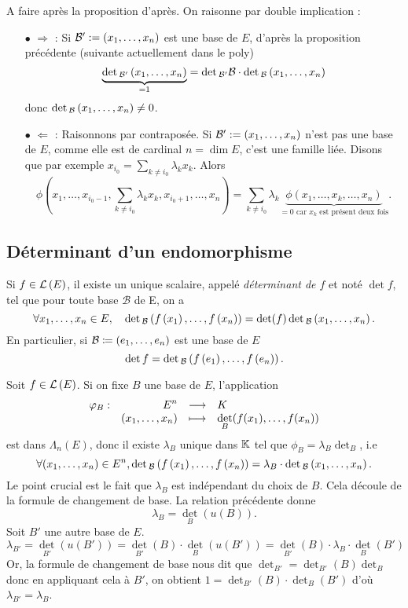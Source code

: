 \documentclass{magnolia}
\begin{document}
  \begin{preuve}
  A faire après la proposition d'après.
  On raisonne par double implication :
  \begin{itemize}
  \item[$\bullet$] $\Rightarrow$ : Si $\mathcal{B}':=\left(x_1,\ldots,x_n\right)$ est une base de $E$, d'après la proposition précédente (suivante actuellement dans le poly) $$\underbrace{\mathop{\rm det}{}_{\mathcal{B}'}\left(x_1,\ldots,x_n\right)}_{=1}=\mathop{\rm det}{}_{\mathcal{B}'}\mathcal{B}\cdot
    \mathop{\rm det}{}_{\mathcal{B}}\left(x_1,\ldots,x_n\right)$$ donc $\mathop{\rm det}{}_{\mathcal{B}}\left(x_1,\ldots,x_n\right)\neq 0$.
  \item[$\bullet$] $\Leftarrow$ : Raisonnons par contraposée. Si $\mathcal{B}':=\left(x_1,\ldots,x_n\right)$ n'est pas une base de $E$, comme elle est de cardinal $n=\dim E$, c'est une famille liée. Disons que par exemple $x_{i_0}=\sum_{k\neq i_0}\lambda_k x_k$. Alors
  $$\phi(x_1,\ldots,x_{i_0-1},\sum_{k\neq i_0}\lambda_k x_k,x_{i_0+1},\ldots,x_n)=\sum_{k\neq i_0}\lambda_k \underbrace{\phi(x_1,\ldots,x_k,\ldots,x_n)}_{=0 \text{ car } x_k \text{ est présent deux fois}}.$$
  \end{itemize}
  \end{preuve}

\subsection{Déterminant d'un endomorphisme}
\begin{definition}
Si $f\in\mathcal{L}\left(E\right)$, il existe un unique scalaire, appelé \emph{déterminant de $f$} et noté
$\det f$, tel que pour toute base $\mathcal{B}$ de E, on a
\[\forall x_1,\ldots,x_n\in E ,\quad
  \mathop{\rm det}{}_{\mathcal{B}}\left(f\left(x_1\right),\ldots,f\left(x_n\right)\right)=\mathop{\rm det}(f)\mathop{\rm det}{}_{\mathcal{B}}
  \left(x_1,\ldots,x_n\right).\]
En particulier, si $\mathcal{B}\coloneqq\left(e_1,\ldots,e_n\right)$ est une base de $E$
\[\mathop{\rm det} f=\mathop{\rm det}{}_{\mathcal{B}}\left(f\left(e_1\right),\ldots,f\left(e_n\right)\right).\]
\end{definition}

\begin{preuve}
Soit $f\in \mathcal{L}\left(E\right)$. Si on fixe $B$ une base de $E$, l'application $$\begin{array}[t]{lrcl} \displaystyle{\varphi_B} : & \displaystyle{E^n} & \longrightarrow & \displaystyle{K} \\ & \displaystyle{(x_1,\ldots,x_n)} & \longmapsto & \displaystyle{\mathop{\rm det}_B(f(x_1),\ldots,f(x_n))} \end{array}$$ est dans $\Lambda_n(E)$, donc il existe $\lambda_B$ unique dans $\mathbb{K}$ tel que $\phi_B=\lambda_B\det_B$, i.e
$$\forall (x_1,\ldots,x_n)\in E^n, \mathop{\rm det}{}_{\mathcal{B}}\left(f\left(x_1\right),\ldots,f\left(x_n\right)\right)=\lambda_B\cdot\mathop{\rm det}{}_{\mathcal{B}}
  \left(x_1,\ldots,x_n\right).$$
  Le point crucial est le fait que $\lambda_B$ est indépendant du choix de $B$. Cela découle de la formule de changement de base. La relation précédente donne $$\lambda_B=\det_B(u(B)).$$
  Soit $B'$ une autre base de $E$.
  $$\lambda_{B'}=\det_{B'}(u(B'))=\det_{B'}(B)\cdot \det_B(u(B'))=\det_{B'}(B)\cdot \lambda_B \cdot \det_{B}(B')$$
  Or, la formule de changement de base nous dit que $\det_{B'}=\det_{B'}(B)\det_B$ donc en appliquant cela à $B'$, on obtient $1=\det_{B'}(B)\cdot \det_{B}(B')$ d'où $\lambda_{B'}=\lambda_B$.

\end{preuve}
\end{document}
